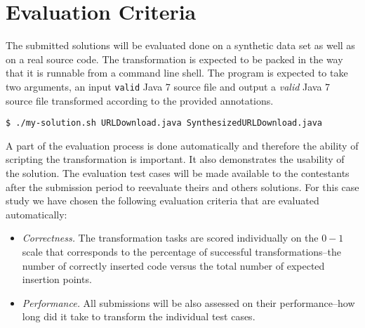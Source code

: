
\section{Evaluation Criteria}
\label{sec:EvaluationCriteria}

The submitted solutions will be evaluated done on a synthetic data set as well as on a real source code.
The transformation is expected to be packed in the way that it is runnable from a command line shell.
The program is expected to take two arguments, an input \texttt{valid} Java 7 source file and output a \emph{valid} Java 7 source file transformed according to the provided annotations.
%
\begin{verbatim}
$ ./my-solution.sh URLDownload.java SynthesizedURLDownload.java
\end{verbatim}

A part of the evaluation process is done automatically and therefore the ability of scripting the transformation is important.
It also demonstrates the usability of the solution.
The evaluation test cases will be made available to the contestants after the submission period to reevaluate theirs and others solutions.
For this case study we have chosen the following evaluation criteria that are evaluated automatically:
%
\begin{itemize}[--]
  \item \emph{Correctness.} The transformation tasks are scored individually on the $0-1$ scale that corresponds to the percentage of successful transformations--\Ie the number of correctly inserted code versus the total number of expected insertion points.
  
  \item \emph{Performance.} All submissions will be also assessed on their performance--\Ie how long did it take to transform the individual test cases.
\end{itemize}

